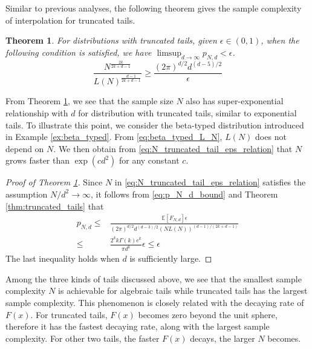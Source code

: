 \documentclass[conference,a4paper]{IEEEtran}
\def\E{\mathbb{E}}
\newtheorem{theorem}{Theorem}
\begin{document}
 Similar to previous analyses,
 the following theorem gives the sample complexity of interpolation for truncated tails.
 \begin{theorem}\label{thm:truncated_tails_sample}
  For distributions with truncated tails,
  given $\epsilon \in (0,1)$,
  when the following condition is satisfied,
  we have $ \limsup_{d\to \infty} p_{N,d} < \epsilon$.
  \begin{equation}\label{eq:N_truncated_tail_eps_relation}
    \frac{N^{\frac{2k}{2k+d-1}}}{L(N)^{\frac{d-1}{2k+d-1}}} 
         \geq \frac{(2\pi)^{d/2}d^{(d-5)/2}}{\epsilon}
  \end{equation}  
\end{theorem}
From Theorem \ref{thm:truncated_tails_sample}, we see that
the sample size $N$ also has super-exponential relationship
with $d$ for distribution with truncated tails, similar to
exponential tails.
To illustrate this point, we consider the beta-typed distribution introduced
in Example \ref{ex:beta_typed}.
From \eqref{eq:beta_typed_L_N}, $L(N)$ does not depend on $N$.
We then obtain from \eqref{eq:N_truncated_tail_eps_relation} that $N$ grows faster than $\exp(cd^2)$ for any constant $c$.
\begin{proof}[Proof of Theorem \ref{thm:truncated_tails_sample}]
     Since $N$ in \eqref{eq:N_truncated_tail_eps_relation} satisfies the assumption $N/d^2 \to \infty$,
     it follows from \eqref{eq:p_N_d_bound} and Theorem \ref{thm:truncated_tails} that
     \begin{align*}
     p_{N,d} \leq &\frac{\E[F_{N,d}]\epsilon}{(2\pi)^{d/2} d^{(d-3)/2} (NL(N))^{(d-1)/(2k+d-1)}}\\
     \leq & \frac{2^k k\Gamma(k)e^k}{\pi d^k} \epsilon \leq \epsilon
     \end{align*}
     The last inequality holds when $d$ is sufficiently large.
\end{proof}
Among the three kinds of tails discussed above, we see that the smallest sample complexity $N$
is achievable for algebraic tails while 
truncated tails has the largest sample complexity.
This phenomenon is closely related with the decaying rate of $F(x)$.
For truncated tails, $F(x)$ becomes zero beyond the unit sphere, therefore it has the fastest decaying rate,
along with the largest sample complexity.
For other two tails, the faster $F(x)$ decays, the larger $N$ becomes.

\end{document}
